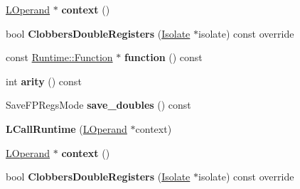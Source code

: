 \begin{DoxyCompactItemize}
\item 
\hyperlink{classv8_1_1internal_1_1_l_operand}{L\+Operand} $\ast$ {\bfseries context} ()\hypertarget{classv8_1_1internal_1_1_l_call_runtime_a53d124954c165c48517bcb9163072229}{}\label{classv8_1_1internal_1_1_l_call_runtime_a53d124954c165c48517bcb9163072229}

\item 
bool {\bfseries Clobbers\+Double\+Registers} (\hyperlink{classv8_1_1internal_1_1_isolate}{Isolate} $\ast$isolate) const  override\hypertarget{classv8_1_1internal_1_1_l_call_runtime_a4bf2712add569c33e2d6106c63c0f1ff}{}\label{classv8_1_1internal_1_1_l_call_runtime_a4bf2712add569c33e2d6106c63c0f1ff}

\item 
const \hyperlink{structv8_1_1internal_1_1_runtime_1_1_function}{Runtime\+::\+Function} $\ast$ {\bfseries function} () const \hypertarget{classv8_1_1internal_1_1_l_call_runtime_ac92d3ff58d96d75e965c38dbbc3ae1ee}{}\label{classv8_1_1internal_1_1_l_call_runtime_ac92d3ff58d96d75e965c38dbbc3ae1ee}

\item 
int {\bfseries arity} () const \hypertarget{classv8_1_1internal_1_1_l_call_runtime_a48b7ab12a64bdad01522b517180dc1f9}{}\label{classv8_1_1internal_1_1_l_call_runtime_a48b7ab12a64bdad01522b517180dc1f9}

\item 
Save\+F\+P\+Regs\+Mode {\bfseries save\+\_\+doubles} () const \hypertarget{classv8_1_1internal_1_1_l_call_runtime_abaa882f65ae172f9475a0ae3ff632509}{}\label{classv8_1_1internal_1_1_l_call_runtime_abaa882f65ae172f9475a0ae3ff632509}

\item 
{\bfseries L\+Call\+Runtime} (\hyperlink{classv8_1_1internal_1_1_l_operand}{L\+Operand} $\ast$context)\hypertarget{classv8_1_1internal_1_1_l_call_runtime_a0944b0ab9e1843075170591acb313644}{}\label{classv8_1_1internal_1_1_l_call_runtime_a0944b0ab9e1843075170591acb313644}

\item 
\hyperlink{classv8_1_1internal_1_1_l_operand}{L\+Operand} $\ast$ {\bfseries context} ()\hypertarget{classv8_1_1internal_1_1_l_call_runtime_a53d124954c165c48517bcb9163072229}{}\label{classv8_1_1internal_1_1_l_call_runtime_a53d124954c165c48517bcb9163072229}

\item 
bool {\bfseries Clobbers\+Double\+Registers} (\hyperlink{classv8_1_1internal_1_1_isolate}{Isolate} $\ast$isolate) const  override\hypertarget{classv8_1_1internal_1_1_l_call_runtime_a4bf2712add569c33e2d6106c63c0f1ff}{}\label{classv8_1_1internal_1_1_l_call_runtime_a4bf2712add569c33e2d6106c63c0f1ff}


\end{DoxyCompactItemize}
